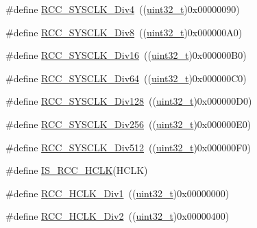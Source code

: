 \begin{DoxyCompactItemize}
\#define \hyperlink{group___a_h_b__clock__source_ga458f8ae63164e878930dbebd7643f087}{R\+C\+C\+\_\+\+S\+Y\+S\+C\+L\+K\+\_\+\+Div4}~((\hyperlink{_p_e___types_8h_a33594304e786b158f3fb30289278f5af}{uint32\+\_\+t})0x00000090)
\item 
\#define \hyperlink{group___a_h_b__clock__source_gade72fe3aca89f3e8c4fe8692ea217912}{R\+C\+C\+\_\+\+S\+Y\+S\+C\+L\+K\+\_\+\+Div8}~((\hyperlink{_p_e___types_8h_a33594304e786b158f3fb30289278f5af}{uint32\+\_\+t})0x000000\+A0)
\item 
\#define \hyperlink{group___a_h_b__clock__source_gaefd8df4be9c9dbd9cebfb2384933500a}{R\+C\+C\+\_\+\+S\+Y\+S\+C\+L\+K\+\_\+\+Div16}~((\hyperlink{_p_e___types_8h_a33594304e786b158f3fb30289278f5af}{uint32\+\_\+t})0x000000\+B0)
\item 
\#define \hyperlink{group___a_h_b__clock__source_gab6a2c2d4e945c607259988a9b6df26e5}{R\+C\+C\+\_\+\+S\+Y\+S\+C\+L\+K\+\_\+\+Div64}~((\hyperlink{_p_e___types_8h_a33594304e786b158f3fb30289278f5af}{uint32\+\_\+t})0x000000\+C0)
\item 
\#define \hyperlink{group___a_h_b__clock__source_ga1a28926fcb86112058a365e01fe9a46b}{R\+C\+C\+\_\+\+S\+Y\+S\+C\+L\+K\+\_\+\+Div128}~((\hyperlink{_p_e___types_8h_a33594304e786b158f3fb30289278f5af}{uint32\+\_\+t})0x000000\+D0)
\item 
\#define \hyperlink{group___a_h_b__clock__source_gaa28bb876893b3267a813fc98a462d5ee}{R\+C\+C\+\_\+\+S\+Y\+S\+C\+L\+K\+\_\+\+Div256}~((\hyperlink{_p_e___types_8h_a33594304e786b158f3fb30289278f5af}{uint32\+\_\+t})0x000000\+E0)
\item 
\#define \hyperlink{group___a_h_b__clock__source_gab5b4588c455d6327bc96f131ed6698ab}{R\+C\+C\+\_\+\+S\+Y\+S\+C\+L\+K\+\_\+\+Div512}~((\hyperlink{_p_e___types_8h_a33594304e786b158f3fb30289278f5af}{uint32\+\_\+t})0x000000\+F0)
\item 
\#define \hyperlink{group___a_h_b__clock__source_ga6e9f1c193a2f41bcb3c2f7fa8459b5b3}{I\+S\+\_\+\+R\+C\+C\+\_\+\+H\+C\+LK}(H\+C\+LK)
\item 
\#define \hyperlink{group___a_p_b1___a_p_b2__clock__source_gae62b4a39ae69cc221f2ab7d4518bfb76}{R\+C\+C\+\_\+\+H\+C\+L\+K\+\_\+\+Div1}~((\hyperlink{_p_e___types_8h_a33594304e786b158f3fb30289278f5af}{uint32\+\_\+t})0x00000000)
\item 
\#define \hyperlink{group___a_p_b1___a_p_b2__clock__source_ga177bb3648def9a961c16f93f15ca0f62}{R\+C\+C\+\_\+\+H\+C\+L\+K\+\_\+\+Div2}~((\hyperlink{_p_e___types_8h_a33594304e786b158f3fb30289278f5af}{uint32\+\_\+t})0x00000400)
\item 

\end{DoxyCompactItemize}
